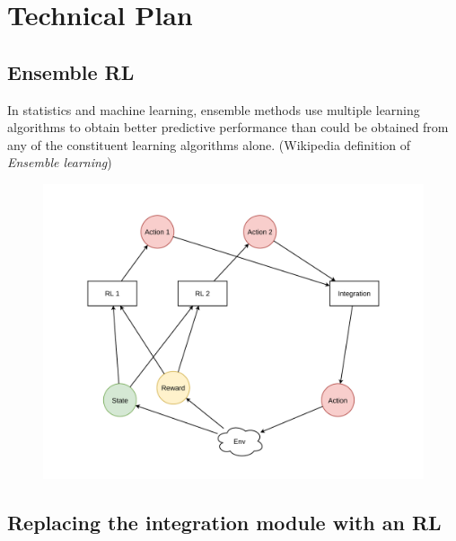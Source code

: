 



\section*{Technical Plan}

\subsection{Ensemble RL}
In statistics and machine learning, ensemble methods use multiple learning algorithms to obtain better predictive performance than could be obtained from any of the constituent learning algorithms alone. (Wikipedia definition of \emph{Ensemble learning})

\begin{figure}[h]
    \includegraphics[width=\textwidth]{images/step_1.pdf}
\end{figure}

\newpage
\subsection{Replacing the integration module with an RL}

